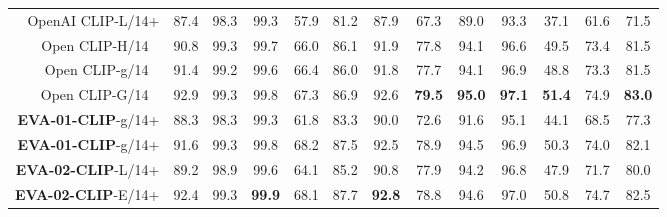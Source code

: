 \documentclass[10pt,twocolumn,letterpaper]{article}
\newcommand{\evablue}[1]{\textcolor{00blue!80}{#1}}
\newcommand{\ph}[1]{\textcolor{white}{#1}}
\newcommand{\phgray}[1]{\textcolor{Graylight!30}{#1}}
\newcommand{\evaOneclip}{{\textbf{\evablue{EVA-01-CLIP}}}\xspace}
\newcommand{\evaTwoclip}{{\textbf{\evablue{EVA-02-CLIP}}}\xspace}
\newcommand{\rgray}{\rowcolor{Graylight!30}}
\begin{document}
\begin{table*}[h]
\begin{tabular}{r|ccc|ccc|ccc|ccc}
        \scriptsize OpenAI CLIP-L/14+ & \scriptsize 87.4 & \scriptsize 98.3 & \scriptsize 99.3 & \scriptsize 57.9 & \scriptsize 81.2 & \scriptsize 87.9 & \scriptsize 67.3 & \scriptsize 89.0 & \scriptsize 93.3 & \scriptsize 37.1 & \scriptsize 61.6 & \scriptsize 71.5 \\
        \scriptsize Open CLIP-H/14\ph{+} & \scriptsize 90.8 & \scriptsize 99.3 & \scriptsize 99.7 & \scriptsize 66.0 & \scriptsize 86.1 & \scriptsize 91.9 & \scriptsize 77.8 & \scriptsize 94.1 & \scriptsize 96.6 & \scriptsize 49.5 & \scriptsize 73.4 & \scriptsize 81.5 \\
        \scriptsize Open CLIP-g/14\ph{+} & \scriptsize 91.4 & \scriptsize 99.2 & \scriptsize 99.6 & \scriptsize 66.4 & \scriptsize 86.0 & \scriptsize 91.8 & \scriptsize 77.7 & \scriptsize 94.1 & \scriptsize 96.9 & \scriptsize 48.8 & \scriptsize 73.3 & \scriptsize 81.5 \\
        \scriptsize Open CLIP-G/14\ph{+} & \scriptsize 92.9 & \scriptsize 99.3 & \scriptsize 99.8 & \scriptsize 67.3 & \scriptsize 86.9 & \scriptsize 92.6 & \scriptsize \textbf{79.5} & \scriptsize \textbf{95.0} & \scriptsize \textbf{97.1} & \scriptsize \textbf{51.4} & \scriptsize 74.9 & \scriptsize \textbf{83.0} \\
        \rgray
        \scriptsize \evaOneclip-g/14\phgray{+} & \scriptsize 88.3 & \scriptsize 98.3 & \scriptsize 99.3 & \scriptsize 61.8 & \scriptsize 83.3 & \scriptsize 90.0 & \scriptsize 72.6 & \scriptsize 91.6 & \scriptsize 95.1 & \scriptsize 44.1 & \scriptsize 68.5 & \scriptsize 77.3 \\
        \rgray
        \scriptsize \evaOneclip-g/14+ & \scriptsize 91.6 & \scriptsize 99.3 & \scriptsize 99.8 & \scriptsize 68.2 & \scriptsize 87.5 & \scriptsize 92.5 & \scriptsize 78.9 & \scriptsize 94.5 & \scriptsize 96.9 & \scriptsize 50.3 & \scriptsize 74.0 & \scriptsize 82.1 \\
        \rgray
        \scriptsize \evaTwoclip-L/14+ & \scriptsize 89.2 & \scriptsize {98.9} & \scriptsize 99.6 & \scriptsize 64.1 & \scriptsize 85.2 & \scriptsize {90.8} & \scriptsize {77.9} & \scriptsize {94.2} & \scriptsize {96.8} & \scriptsize {47.9} & \scriptsize {71.7} & \scriptsize {80.0} \\
        \rgray
        \scriptsize \evaTwoclip-E/14\phgray{+} & \scriptsize 92.4 & \scriptsize 99.3 & \scriptsize \textbf{99.9} & \scriptsize 68.1 & \scriptsize 87.7 & \scriptsize \textbf{92.8} & \scriptsize 78.8 & \scriptsize 94.6 & \scriptsize 97.0 & \scriptsize 50.8 & \scriptsize 74.7 & \scriptsize 82.5 \\

\end{tabular}
\end{table*}
\end{document}
